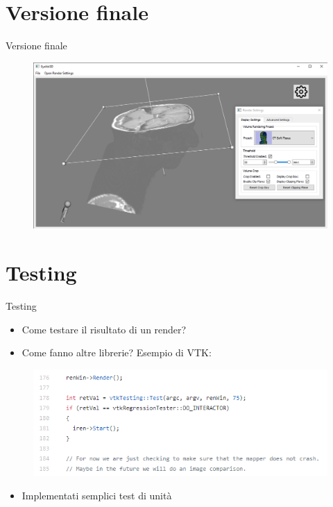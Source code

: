 \documentclass{beamer}
\begin{document}
	
	\section{Versione finale}
	\begin{frame}{Versione finale}
	
	\begin{figure}[ht]
    	\centering
    	\includegraphics[width=1\textwidth]{Images/rmcapture.png}
	\end{figure}
	
	\end{frame}
	
	
	\section{Testing}
	\begin{frame}{Testing}
	
	\begin{itemize}
		\item Come testare il risultato di un render?
		\item Come fanno altre librerie? Esempio di VTK:
	\end{itemize}	
	
	\begin{figure}[ht]
    	\centering
    	\includegraphics[width=1\textwidth]{Images/vtktests.png}
	\end{figure}
	
	\begin{itemize}
		\item Implementati semplici test di unità
	\end{itemize}
	
	\end{frame}
	
\end{document}
